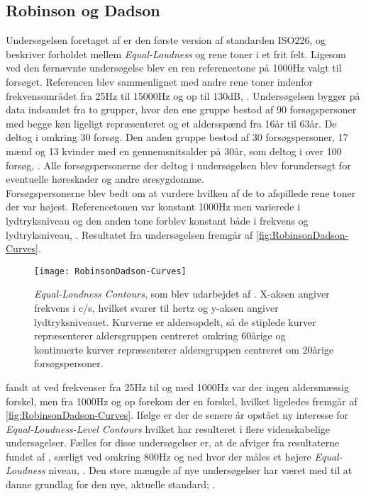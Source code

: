 \subsection{Robinson og Dadson}
\label{Robinson-Dadson}
Undersøgelsen foretaget af \textcite[s. 166]{PDF:RobinsonDadson} er den første version af standarden ISO226, og beskriver forholdet mellem \textit{Equal-Loudness} og rene toner i et frit felt. Ligesom ved den førnævnte undersøgelse blev en ren referencetone på 1000Hz valgt til forsøget. Referencen blev sammenlignet med andre rene toner indenfor frekvensområdet fra 25Hz til 15000Hz og op til 130dB, \parencite[s. 167]{PDF:RobinsonDadson}. Undersøgelsen bygger på data indsamlet fra to grupper, hvor den ene gruppe bestod af 90 forsøgspersoner med begge køn ligeligt repræsenteret og et aldersspænd fra 16år til 63år. De deltog i omkring 30 forsøg. Den anden gruppe bestod af 30 forsøgspersoner, 17 mænd og 13 kvinder med en gennemsnitsalder på 30år, som deltog i over 100 forsøg, \parencite[s. 167]{PDF:RobinsonDadson}. Alle forsøgspersonerne der deltog i undersøgelsen blev forundersøgt for eventuelle høreskader og andre øresygdomme.\\
Forsøgspersonerne blev bedt om at vurdere hvilken af de to afspillede rene toner der var højest. Referencetonen var konstant 1000Hz men varierede i lydtryksniveau og den anden tone forblev konstant både i frekvens og lydtryksniveau, \parencite[s. 168]{PDF:RobinsonDadson}. Resultatet fra undersøgelsen fremgår af \autoref{fig:RobinsonDadson-Curves}.
%
\begin{figure}[H]
	\centering
	\texttt{[image: RobinsonDadson-Curves]}
	\caption{\textit{Equal-Loudness Contours}, som blev udarbejdet af \textcite[s. 171]{PDF:RobinsonDadson}. X-aksen angiver frekvens i c/s, hvilket svarer til hertz og y-aksen angiver lydtryksniveauet. Kurverne er aldersopdelt, så de stiplede kurver repræsenterer aldersgruppen centreret omkring 60årige og kontinuerte kurver repræsenterer aldersgruppen centreret om 20årige forsøgspersoner.}
	\label{fig:RobinsonDadson-Curves}
\end{figure}
\noindent
%
\textcite[s. 171]{PDF:RobinsonDadson} fandt at ved frekvenser fra 25Hz til og med 1000Hz var der ingen aldersmæssig forskel, men fra 1000Hz og op forekom der en forskel, hvilket ligeledes fremgår af \autoref{fig:RobinsonDadson-Curves}.
\blankline
Ifølge \textcite[s. 918]{PDF:EqualLoudnessForPureTones} er der de senere år opstået ny interesse for \textit{Equal-Loudness-Level Contours} hvilket har resulteret i flere videnskabelige undersøgelser. Fælles for disse undersøgelser er, at de afviger fra resultaterne fundet af \textcite[s. 171]{PDF:RobinsonDadson}, særligt ved omkring 800Hz og ned hvor der måles et højere \textit{Equal-Loudness} niveau, \parencite[s. 918]{PDF:EqualLoudnessForPureTones}. Den store mængde af nye undersøgelser har været med til at danne grundlag for den nye, aktuelle standard; \textcite{STD:ISO226}.
%
